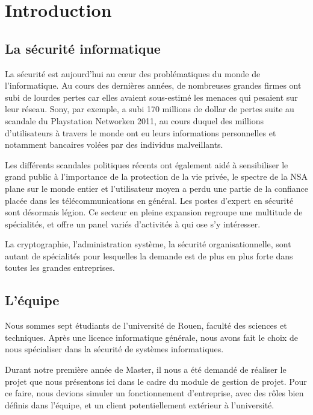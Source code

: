\chapter{Introduction}

\section{La sécurité informatique}

La sécurité est aujourd'hui au cœur des problématiques du monde de l'informatique. Au cours des dernières années, de nombreuses grandes firmes ont subi de lourdes pertes car elles avaient sous-estimé les menaces qui pesaient sur leur réseau. Sony\textregistered, par exemple, a subi 170 millions de dollar\cite{PSN} de pertes suite au scandale du Playstation Network\texttrademark en 2011, au cours duquel des millions d'utilisateurs à travers le monde ont eu leurs informations personnelles et notamment bancaires volées par des individus malveillants.

 Les différents scandales politiques récents ont également aidé à sensibiliser le grand public à l'importance de la protection de la vie privée, le spectre de la NSA plane sur le monde entier et l'utilisateur moyen a perdu une partie de la confiance placée dans les télécommunications en général. Les postes d'expert en sécurité sont désormais légion. Ce secteur en pleine expansion regroupe une multitude de spécialités, et offre un panel variés d'activités à qui ose s'y intéresser.
 
La cryptographie, l'administration système, la sécurité organisationnelle, sont autant de spécialités pour lesquelles la demande est de plus en plus forte dans toutes les grandes entreprises.

\section{L'équipe}

Nous sommes sept étudiants de l'université de Rouen, faculté des sciences et techniques. Après une licence informatique générale, nous avons fait le choix de nous spécialiser dans la sécurité de systèmes informatiques.

 Durant notre première année de Master, il nous a été demandé de réaliser le projet que nous présentons ici dans le cadre du module de gestion de projet. Pour ce faire, nous devions simuler un fonctionnement d'entreprise, avec des rôles bien définis dans l'équipe, et un client potentiellement extérieur à l'université.
 
